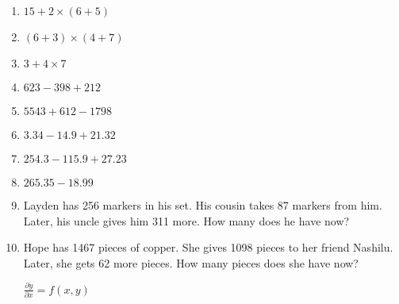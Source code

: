 \documentclass{article}
\begin{document}
\begin{enumerate}
\item \quad \( 15 + 2 \times (6 + 5) \)
\vspace{45pt}
\hline
\vspace{5pt}

\item \quad \( (6 + 3) \times (4 + 7) \)
\vspace{45pt} 
\vspace{5pt}

\item \quad \( 3 + 4 \times 7 \)
\vspace{45pt} 
\hline
\vspace{5pt}

\item \quad \( 623 - 398 + 212\)
\vspace{45pt}
\hline
\vspace{5pt}

\item \quad \( 5543 + 612 - 1798\)
\vspace{80pt}
\hline
\vspace{5pt}

\item \quad \( 3.34 - 14.9 + 21.32\)
\vspace{80pt}
\hline
\vspace{5pt}

\item \quad \( 254.3 - 115.9 + 27.23\)
\vspace{75pt}
\hline
\vspace{5pt}

\item \quad \( 265.35 - 18.99 \)
\vspace{80pt}
\hline
\vspace{5pt}

\item \quad Layden has 256 markers in his set. His cousin takes 87 markers from him. Later, his uncle gives him 311 more. How many does he have now?
\vspace{80pt}
\hline
\vspace{5pt}

\item \quad Hope has 1467 pieces of copper. She gives 1098 pieces to her friend Nashilu. Later, she gets 62 more pieces. How many pieces does she have now?
\vspace{40}

\( \displaystyle  \frac {\partial y}{\partial x} = f(x,y) \)


\end{enumerate}
\end{document}
